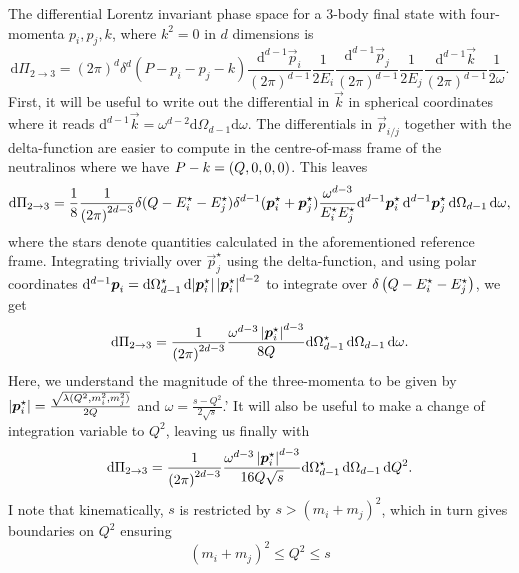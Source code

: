\documentclass[../main.tex]{subfiles}
\begin{document}
The differential Lorentz invariant phase space for a 3-body final state with
four-momenta \(p_i, p_j, k\), where \(k^2=0\) in \(d\) dimensions is
\begin{equation}
  \mathrm{d}\Pi_{2\to 3} = (2\pi)^d \delta^d(P - p_i - p_j - k)
  \frac{\mathrm{d}^{d-1} \vec{p}_i}{(2\pi)^{d-1}} \frac{1}{2E_i}
  \frac{\mathrm{d}^{d-1} \vec{p}_j}{(2\pi)^{d-1}} \frac{1}{2E_j}
  \frac{\mathrm{d}^{d-1} \vec{k}}{(2\pi)^{d-1}} \frac{1}{2\omega}.
\end{equation}
First, it will be useful to write out the differential in \(\vec{k}\) in
spherical coordinates where it reads \(\mathrm{d}^{d-1}\vec{k} = \omega^{d-2}
\mathrm{d}\Omega_{d-1} \mathrm{d}\omega\).
The differentials in \(\vec{p}_{i/j}\) together with the delta-function are
easier to compute in the centre-of-mass frame of the neutralinos where we have
\(P - k = \left(Q, 0, 0, 0\right)\).
This leaves
\begin{equation}
  \mathrm{d}\Pi_{2\to 3} = \frac{1}{8} \frac{1}{\left(2\pi\right)^{2d-3}}
  \delta(Q - E_i^\star - E_j^\star) \delta^{d-1}(\boldsymbol{p}^\star_i +
  \boldsymbol{p}_j^\star) \frac{\omega^{d-3}}{E_i^\star E_j^\star}
  \mathrm{d}^{d-1}\boldsymbol{p}_i^\star\, \mathrm{d}^{d-1}\boldsymbol{p}_j^\star\,
  \mathrm{d}\Omega_{d-1}\, \mathrm{d}\omega,
\end{equation}
where the stars denote quantities calculated in the aforementioned reference
frame.
Integrating trivially over \(\vec{p}_j^\star\) using the delta-function, and
using polar coordinates \(\mathrm{d}^{d-1}\boldsymbol{p}_i =
\mathrm{d}\Omega_{d-1}^\star \, \mathrm{d}\!\left|\boldsymbol{p}_i^\star\right|
\left|\boldsymbol{p}_i^\star\right|^{d-2}\) to integrate over \(\delta\left(Q - E_i^\star
  - E_j^\star\right)\), we get
\begin{equation}
  \mathrm{d}\Pi_{2\to 3} = \frac{1}{\left(2\pi\right)^{2d-3}}
  \frac{\omega^{d-3} \left|\boldsymbol{p}_i^\star\right|^{d-3}}{8Q}
  \mathrm{d}\Omega_{d-1}^\star\, \mathrm{d}\Omega_{d-1}\,
  \mathrm{d}\omega.
\end{equation}
Here, we understand the magnitude of the three-momenta to be given by
\(\left|\boldsymbol{p}_i^\star\right| = \frac{\sqrt{\lambda(Q^2, m_i^2, m_j^2)}}{2Q}\) and
\(\omega = \frac{s-Q^2}{2\sqrt{s}}\).'
It will also be useful to make a change of integration variable to \(Q^2\),
leaving us finally with
\begin{equation}
  \mathrm{d}\Pi_{2\to 3} = \frac{1}{\left(2\pi\right)^{2d-3}}
  \frac{\omega^{d-3} \left|\boldsymbol{p}_i^\star\right|^{d-3}}{16Q\sqrt{s}}
  \mathrm{d}\Omega_{d-1}^\star\, \mathrm{d}\Omega_{d-1}\, \mathrm{d}Q^2.
\end{equation}
I note that kinematically, \(s\) is restricted by \(s > (m_i+m_j)^2\), which in turn gives boundaries on \(Q^2\) ensuring
\begin{equation}
  (m_i + m_j)^2 \leq Q^2 \leq s
\end{equation}
\end{document}
